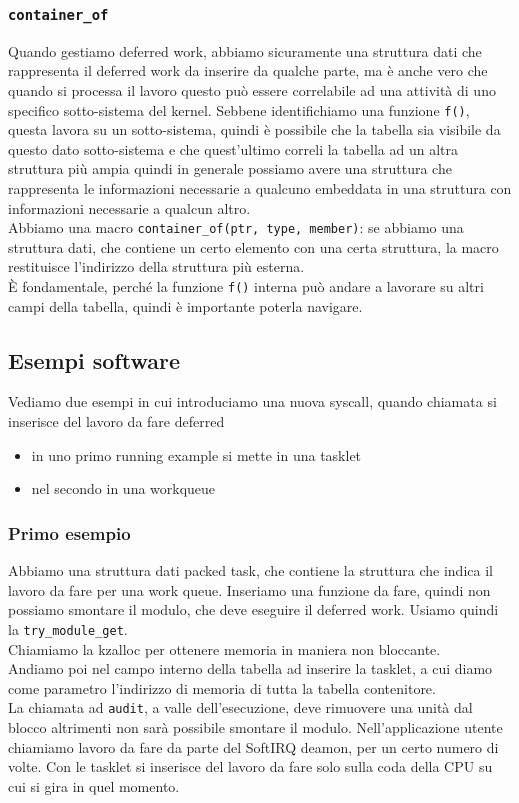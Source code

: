 \documentclass[12pt, oneside]{extbook}
\begin{document}
\subsubsection{\texttt{container\_of}}
Quando gestiamo deferred work, abbiamo sicuramente una struttura dati che rappresenta il deferred work da inserire da qualche parte, ma è anche vero che quando si processa il lavoro questo può essere correlabile ad una attività di uno specifico sotto-sistema del kernel. Sebbene identifichiamo una funzione \texttt{f()}, questa lavora su un sotto-sistema, quindi è possibile che la tabella sia visibile da questo dato sotto-sistema e che quest'ultimo correli la tabella ad un altra struttura più ampia quindi in generale possiamo avere una struttura che rappresenta le informazioni necessarie a qualcuno embeddata in una struttura con informazioni necessarie a qualcun altro.\\Abbiamo una macro \texttt{container\_of(ptr, type, member)}: se abbiamo una struttura dati, che contiene un certo elemento con una certa struttura, la macro restituisce l'indirizzo della struttura più esterna.\\È fondamentale, perché la funzione \texttt{f()} interna può andare a lavorare su altri campi della tabella, quindi è importante poterla navigare.
\subsection*{Esempi software}
Vediamo due esempi in cui introduciamo una nuova syscall, quando chiamata si inserisce del lavoro da fare deferred
\begin{itemize}
\item in uno primo running example si mette in una tasklet
\item nel secondo in una workqueue
\end{itemize}
\subsubsection{Primo esempio}
Abbiamo una struttura dati packed task, che contiene la struttura che indica il lavoro da fare per una work queue. Inseriamo una funzione da fare, quindi non possiamo smontare il modulo, che deve eseguire il deferred work. Usiamo quindi la \texttt{try\_module\_get}.\\Chiamiamo la kzalloc per ottenere memoria in maniera non bloccante.\\Andiamo poi nel campo interno della tabella ad inserire la tasklet, a cui diamo come parametro l'indirizzo di memoria di tutta la tabella contenitore.\\La chiamata ad \texttt{audit}, a valle dell'esecuzione, deve rimuovere una unità dal blocco altrimenti non sarà possibile smontare il modulo. Nell'applicazione utente chiamiamo lavoro da fare da parte del SoftIRQ deamon, per un certo numero di volte. Con le tasklet si inserisce del lavoro da fare solo sulla coda della CPU su cui si gira in quel momento.
\end{document}
